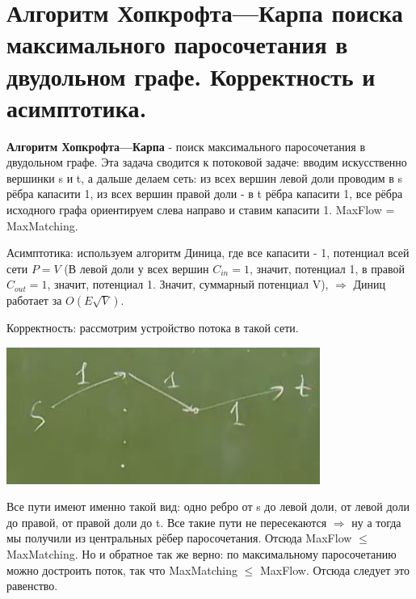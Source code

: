 \setcounter{section}{85}
\section{Алгоритм Хопкрофта—Карпа поиска максимального паросочетания в двудольном графе. Корректность и асимптотика.}

\textbf{Алгоритм Хопкрофта—Карпа} - поиск максимального паросочетания в двудольном графе. Эта задача сводится к потоковой задаче: вводим искусственно вершинки s и t, а дальше делаем сеть: из всех вершин левой доли проводим в s рёбра капасити 1, из всех вершин правой доли - в t рёбра капасити 1, все рёбра исходного графа ориентируем слева направо и ставим капасити 1. MaxFlow = MaxMatching.

Асимптотика: используем алгоритм Диница, где все капасити - 1, потенциал всей сети $P = V$ (В левой доли у всех вершин $C_{in}=1$, значит, потенциал 1, в правой $C_{out}=1$, значит, потенциал 1. Значит, суммарный потенциал V), $\Rightarrow$ Диниц работает за $O(E\sqrt{V})$.

Корректность: рассмотрим устройство потока в такой сети.

\includegraphics[]{images/86_hopcroft}

Все пути имеют именно такой вид: одно ребро от s до левой доли, от левой доли до правой, от правой доли до t. Все такие пути не пересекаются $\Rightarrow$ ну а тогда мы получили из центральных рёбер паросочетания. Отсюда MaxFlow $\leqslant$ MaxMatching. Но и обратное так же верно: по максимальному паросочетанию можно достроить поток, так что MaxMatching $\leqslant$ MaxFlow. Отсюда следует это равенство.